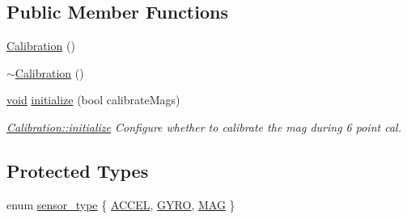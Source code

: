 \subsection*{Public Member Functions}
\begin{DoxyCompactItemize}
\item 
\hyperlink{class_calibration_a80f51a5ff7ec0f44d5388c9a61d1f20b}{Calibration} ()
\item 
\hyperlink{class_calibration_a108efb6ccd8c98e5cac950be4bf0ac26}{$\sim$\-Calibration} ()
\item 
\hyperlink{group___u_a_v_objects_plugin_ga444cf2ff3f0ecbe028adce838d373f5c}{void} \hyperlink{class_calibration_a0ceb0c6dbb32b8f6f40a088221da3f4a}{initialize} (bool calibrate\-Mags)
\begin{DoxyCompactList}\small\item\em \hyperlink{class_calibration_a0ceb0c6dbb32b8f6f40a088221da3f4a}{Calibration\-::initialize} Configure whether to calibrate the mag during 6 point cal. \end{DoxyCompactList}\end{DoxyCompactItemize}
\subsection*{Protected Types}
\begin{DoxyCompactItemize}
\item 
enum \hyperlink{class_calibration_ab4af1e75c9a40776a4c5ed1da5e7caf8}{sensor\-\_\-type} \{ \hyperlink{class_calibration_ab4af1e75c9a40776a4c5ed1da5e7caf8a3d0c57c4632846573b22a605d31d59fd}{A\-C\-C\-E\-L}, 
\hyperlink{class_calibration_ab4af1e75c9a40776a4c5ed1da5e7caf8a80751a325ad77e6a9240bc534ca9b5e8}{G\-Y\-R\-O}, 
\hyperlink{class_calibration_ab4af1e75c9a40776a4c5ed1da5e7caf8a40b1af5ef9ac8c8600e3190a06bf81ca}{M\-A\-G}
 \}
\end{DoxyCompactItemize}
